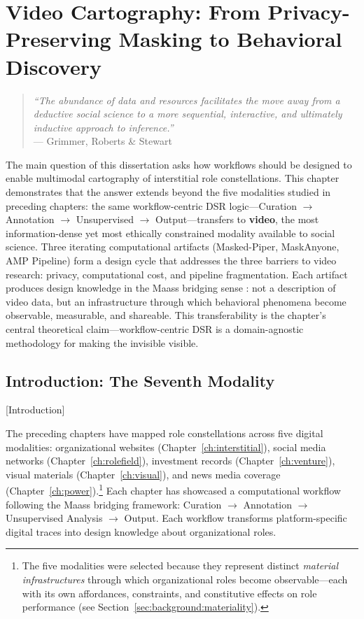 \documentclass[../main.tex]{subfiles}
\begin{document}
\chapter{Video Cartography: From Privacy-Preserving Masking to Behavioral Discovery}
\margintoc

\begin{quote}
\textit{``The abundance of data and resources facilitates the move away from a deductive social science to a more sequential, interactive, and ultimately inductive approach to inference.''}\\
--- Grimmer, Roberts \& Stewart \cite{grimmer2021machine}
\end{quote}

\begin{chapteroverview}
The main question of this dissertation asks how workflows should be designed to enable multimodal cartography of interstitial role constellations. This chapter demonstrates that the answer extends beyond the five modalities studied in preceding chapters: the same workflow-centric DSR logic---Curation $\rightarrow$ Annotation $\rightarrow$ Unsupervised $\rightarrow$ Output---transfers to \textbf{video}, the most information-dense yet most ethically constrained modality available to social science. Three iterating computational artifacts (Masked-Piper, MaskAnyone, AMP Pipeline) form a design cycle that addresses the three barriers to video research: privacy, computational cost, and pipeline fragmentation. Each artifact produces design knowledge in the Maass bridging sense \parencite{maass2018data}: not a description of video data, but an infrastructure through which behavioral phenomena become observable, measurable, and shareable. This transferability is the chapter's central theoretical claim---workflow-centric DSR is a domain-agnostic methodology for making the invisible visible.
\end{chapteroverview}

\section{Introduction: The Seventh Modality}[Introduction]

The preceding chapters have mapped role constellations across five digital modalities: organizational websites (Chapter~\ref{ch:interstitial}), social media networks (Chapter~\ref{ch:rolefield}), investment records (Chapter~\ref{ch:venture}), visual materials (Chapter~\ref{ch:visual}), and news media coverage (Chapter~\ref{ch:power}).\footnote{The five modalities were selected because they represent distinct \textit{material infrastructures} through which organizational roles become observable---each with its own affordances, constraints, and constitutive effects on role performance (see Section~\ref{sec:background:materiality}).} Each chapter has showcased a computational workflow following the Maass bridging framework: Curation $\rightarrow$ Annotation $\rightarrow$ Unsupervised Analysis $\rightarrow$ Output. Each workflow transforms platform-specific digital traces into design knowledge about organizational roles.
\end{document}
